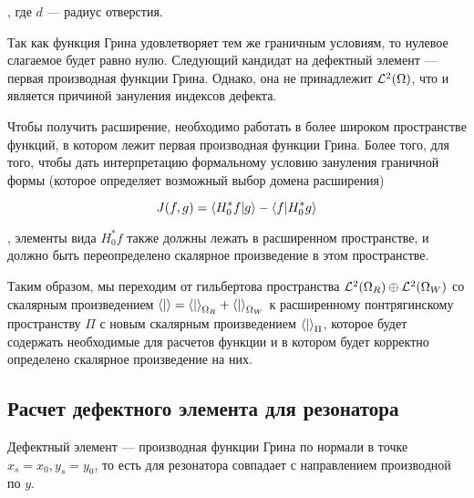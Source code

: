 , где $d$ — радиус отверстия.

Так как функция Грина удовлетворяет тем же граничным условиям, то нулевое слагаемое будет равно нулю. Следующий кандидат на дефектный элемент — первая производная функции Грина. Однако, она не принадлежит $\mathcal{L}^2(\Omega)$, что и является причиной зануления индексов дефекта.

Чтобы получить расширение, необходимо работать в более широком пространстве функций, в котором лежит первая производная функции Грина. Более того, для того, чтобы дать интерпретацию формальному условию зануления граничной формы (которое определяет возможный выбор домена расширения)

\[
J(f, g) = \ip{H_0^* f}{g} - \ip{f}{H_0^* g}
\]

, элементы вида $H_0^* f$ также должны лежать в расширенном пространстве, и должно быть переопределено скалярное произведение в этом пространстве.

Таким образом, мы переходим от гильбертова пространства $\mathcal{L}^2(\Omega_R) \oplus \mathcal{L}^2(\Omega_W)$ со скалярным произведением $\ip{}{} = \ip{}{}_{\Omega_R} + \ip{}{}_{\Omega_W}$ к расширенному понтрягинскому пространству $\Pi$ с новым скалярным произведением $\ip{}{}_\Pi$, которое будет содержать необходимые для расчетов функции и в котором будет корректно определено скалярное произведение на них.






\subsection{Расчет дефектного элемента для резонатора}
Дефектный элемент — производная функции Грина по нормали в точке $x_s = x_0, y_s = y_0$, то есть для резонатора совпадает с направлением производной по $y$.

